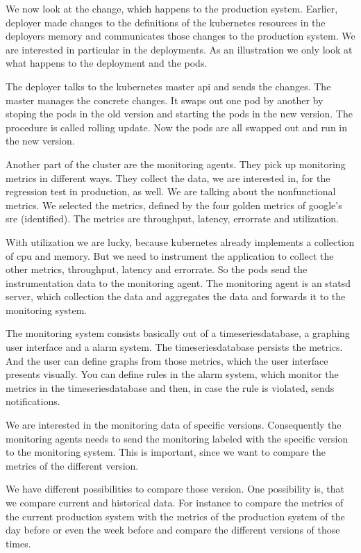 We now look at the change, which happens to the production system. Earlier, deployer made
changes to the definitions of the kubernetes resources in the deployers memory and
communicates those changes to the production system. We are interested in particular in
the deployments. As an illustration we only look at what happens to the deployment and the
pods.

The deployer talks to the kubernetes master api and sends the changes. The master manages
the concrete changes. It swaps out one pod by another by stoping the pods in the old
version and starting the pods in the new version. The procedure is called rolling
update. Now the pods are all swapped out and run in the new version.

Another part of the cluster are the monitoring agents. They pick up monitoring metrics in
different ways. They collect the data, we are interested in, for the regression test in
production, as well. We are talking about the nonfunctional metrics. We selected the
metrics, defined by the four golden metrics of google's sre (identified). The metrics are
throughput, latency, errorrate and utilization.

With utilization we are lucky, because kubernetes already implements a collection of cpu
and memory. But we need to instrument the application to collect the other metrics,
throughput, latency and errorrate. So the pods send the instrumentation data to the
monitoring agent. The monitoring agent is an statsd server, which collection the data and
aggregates the data and forwards it to the monitoring system.

The monitoring system consists basically out of a timeseriesdatabase, a graphing user
interface and a alarm system. The timeseriesdatabase persists the metrics. And the user
can define graphs from those metrics, which the user interface presents visually. You can
define rules in the alarm system, which monitor the metrics in the timeseriesdatabase and
then, in case the rule is violated, sends notifications.

We are interested in the monitoring data of specific versions. Consequently the monitoring
agents needs to send the monitoring labeled with the specific version to the monitoring
system. This is important, since we want to compare the metrics of the different version.

We have different possibilities to compare those version. One possibility is, that we
compare current and historical data. For instance to compare the metrics of the current
production system with the metrics of the production system of the day before or even the
week before and compare the different versions of those times.

